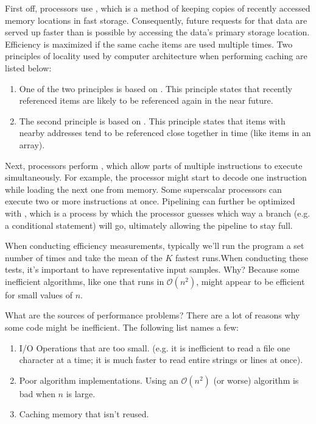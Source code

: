 First off, processors use , which is a method of keeping copies of recently accessed memory locations in fast storage. Consequently, future requests for that data are served up faster than is possible by accessing the data's primary storage location. Efficiency is maximized if the same cache items are used multiple times. Two principles of locality used by computer architecture when performing caching are listed below: \begin{enumerate}
    \item One of the two principles is based on . This principle states that recently referenced items are likely to be referenced again in the near future.
    \item The second principle is based on . This principle states that items with nearby addresses tend to be referenced close together in time (like items in an array).
\end{enumerate}


Next, processors perform , which allow parts of multiple instructions to execute simultaneously. For example, the processor might start to decode one instruction while loading the next one from memory. Some superscalar processors can execute two or more instructions at once. Pipelining can further be optimized with , which is a process by which the processor guesses which way a branch (e.g. a conditional statement) will go, ultimately allowing the pipeline to stay full. 

When conducting efficiency measurements, typically we'll run the program a set number of times and take the mean of the $K$ fastest runs.When conducting these tests, it's important to have representative input samples. Why? Because some inefficient algorithms, like one that runs in $\mathcal{O}(n^2)$, might appear to be efficient for small values of $n$. 


What are the sources of performance problems? There are a lot of reasons why some code might be inefficient. The following list names a few: \begin{enumerate}
    \item I/O Operations that are too small. (e.g. it is inefficient to read a file one character at a time; it is much faster to read entire strings or lines at once).
    \item Poor algorithm implementations. Using an $\mathcal{O}(n^2)$ (or worse) algorithm is bad when $n$ is large.
    \item Caching memory that isn't reused. 
\end{enumerate}


